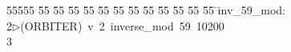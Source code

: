 %
%
\begin{tabbing}
55555 \= 55 \= 55 \= 55 \= 55 \= 55 \= 55 \= 55 \= 55 \= 55 \= 55 \= 55 \= 55 \= \>inv\_59\_mod:\\[0pt]
2\>$\triangleright$\>(ORBITER)\ v\ 2\ inverse\_mod\ 59\ 10200\\[0pt]
3\>\end{tabbing}
